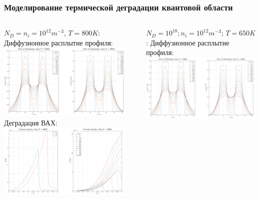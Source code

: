 \documentclass[10pt,pdf,hyperref={unicode},aspectratio={169}]{beamer}
\begin{document}
\begin{frame}
	\frametitle{Моделирование термической деградации квантовой области}
	\centering
	\begin{columns}
		{\color{blue} $N_{D} = n_{i} = 10^{12} m^{-3},\,T = 800K$:}\\
		{\color{red} Диффузионное расплытие профиля:}\\
	   	\includegraphics[width=0.85\linewidth,center]{assets/DCAlGaAs}\\
		{\color{red} Деградация ВАХ:}
	   	\includegraphics[width=.9\linewidth,center]{assets/JDCAlGaAs}
	   	\newline\newline\newline\newline
		\rule[17mm]{0.2ex}{76mm}
		{\color{blue} $N_{D} = 10^{18}; n_{i} = 10^{12} m^{-3};\,T = 650K$:}
		{\color{red} Диффузионное расплытие профиля:}\\
	   	\includegraphics[width=.85\linewidth,center]{assets/DCAlGaAsNd}\\

\end{columns}
\end{frame}
\end{document}

